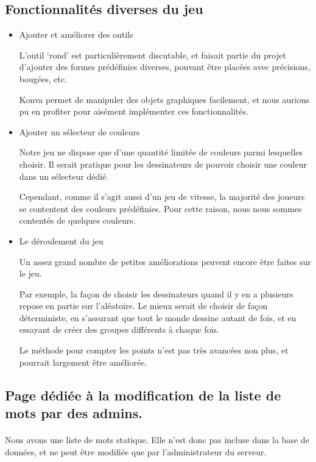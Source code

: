 \documentclass[11pt,a4paper]{article}
\begin{document}
        \subsection*{Fonctionnalités diverses du jeu}
            \begin{itemize}
                \item Ajouter et améliorer des outils
                
                L'outil `rond' est particulièrement discutable,
                et faisait partie du projet d'ajouter des formes prédéfinies diverses,
                pouvant être placées avec précisions, bougées, etc.

                Konva permet de manipuler des objets graphiques facilement,
                et nous aurions pu en profiter pour aisément implémenter ces fonctionnalités.
                \item Ajouter un sélecteur de couleurs
                
                Notre jeu ne dispose que d'une quantité limitée de couleurs parmi lesquelles choisir.
                Il serait pratique pour les dessinateurs de pouvoir choisir une couleur dans un sélecteur dédié.

                Cependant, comme il s'agit aussi d'un jeu de vitesse,
                la majorité des joueurs se contentent des couleurs prédéfinies.
                Pour cette raison, nous nous sommes contentés de quelques couleurs.
                \item Le déroulement du jeu
                
                Un assez grand nombre de petites améliorations peuvent encore être faites sur le jeu.

                Par exemple, la façon de choisir les dessinateurs quand il y en a plusieurs repose en partie sur l'aléatoire.
                Le mieux serait de choisir de façon déterministe, en s'assurant que tout le monde dessine autant de fois,
                et en essayant de créer des groupes différents à chaque fois.

                Le méthode pour compter les points n'est pas très avancées non plus, et pourrait largement être améliorée.
            \end{itemize}
        \subsection*{Page dédiée à la modification de la liste de mots par des admins.}
            \paragraph{}
            Nous avons une liste de mots statique.
            Elle n'est donc pas incluse dans la base de données,
            et ne peut être modifiée que par l'administrateur du serveur.
\end{document}
